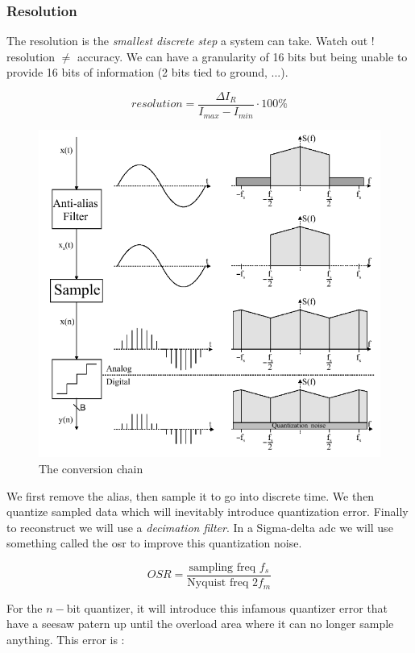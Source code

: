 \documentclass[
  a4paper,
]{article}
\begin{document}
\hypertarget{resolution}{%
\subsubsection{Resolution}\label{resolution}}

The resolution is the \emph{smallest discrete step} a system can take.
Watch out ! resolution \(\neq\) accuracy. We can have a granularity of
16 bits but being unable to provide 16 bits of information (2 bits tied
to ground, ...).

\[resolution = \frac{\Delta I_R}{I_{max} - I_{min}} \cdot 100 \%\]

\begin{figure}
\hypertarget{fig:conversion-chain-label}{%
\centering
\includegraphics{conversion_chain.png}
\caption{The conversion chain}\label{fig:conversion-chain-label}
}
\end{figure}

We first remove the alias, then sample it to go into discrete time. We
then quantize sampled data which will inevitably introduce quantization
error. Finally to reconstruct we will use a \emph{decimation filter}. In
a Sigma-delta {adc} we will use something called the {osr} to improve
this quantization noise.

\[OSR = \frac{\text{sampling freq } f_s}{\text{Nyquist freq } 2 f_m}\]

For the \(n-\)bit quantizer, it will introduce this infamous quantizer
error that have a seesaw patern up until the overload area where it can
no longer sample anything. This error is :
\end{document}

